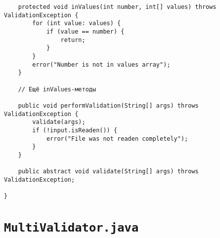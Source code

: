 \begin{verbatim}
    protected void inValues(int number, int[] values) throws ValidationException {
        for (int value: values) {
            if (value == number) {
                return;
            }
        }
        error("Number is not in values array");
    }
    
    // Ещё inValues-методы
    
    public void performValidation(String[] args) throws ValidationException {
        validate(args);
        if (!input.isReaden()) {
            error("File was not readen completely");
        }
    }
    
    public abstract void validate(String[] args) throws ValidationException;
    
}
\end{verbatim}

\section*{\texttt{MultiValidator.java}}
